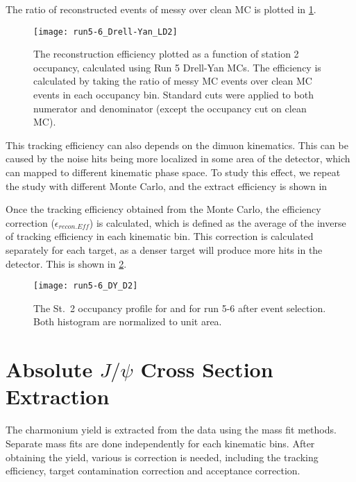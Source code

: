 \documentclass[../main.tex]{subfiles}
\begin{document}
The ratio of reconstructed events of messy over clean MC is plotted in \cref{fig:tracking efficiency}.
\begin{figure}[h!]
	\centering
	\texttt{[image: run5-6\_Drell-Yan\_LD2]}
	\caption{The reconstruction efficiency plotted as a function of station 2 occupancy, calculated using
		Run 5  Drell-Yan MCs.
		The efficiency is calculated by taking the ratio of messy MC events over clean MC events in each
		occupancy bin. Standard cuts were applied to both numerator and denominator
		(except the occupancy cut on clean MC).
	}
	\label{fig:tracking efficiency}
\end{figure}

This tracking efficiency can also depends on the dimuon kinematics. This can be caused
by the noise hits being more localized in some area of the detector, which can mapped to
different kinematic phase space. To study this effect, we repeat the study with different
Monte Carlo, and the extract efficiency is shown in

Once the tracking efficiency obtained from the Monte Carlo, the efficiency correction ($\epsilon_{recon.Eff}$)
is calculated, which is defined as the average of the inverse of tracking efficiency in each
kinematic bin. This correction is calculated separately for each target, as a denser target
will produce more hits in the detector. This is shown in \cref{fig:target_D2}.

\begin{figure}[h!]
	\centering
	\texttt{[image: run5-6\_DY\_D2]}
	\caption{The St.~2 occupancy profile for  and  for run 5-6 after event selection. Both histogram are normalized to unit area.
	}
	\label{fig:target_D2}
\end{figure}


\section{Absolute \texorpdfstring{$J/\psi$}{J/psi} Cross Section Extraction}
The charmonium yield is extracted from the data using the mass fit methods. 
Separate mass fits are done independently for each kinematic bins. After obtaining 
the yield, various is correction is needed, including the tracking efficiency, target
contamination correction and acceptance correction.
\end{document}
